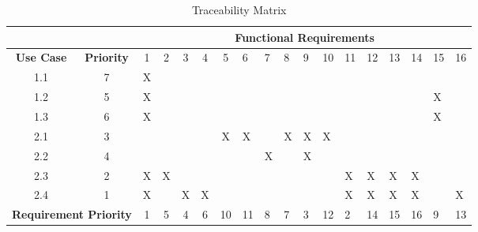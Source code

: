 \documentclass{article}
\begin{document}
		\begin{table}[h]
\centering
\caption{Traceability Matrix}
\label{my-label}
\begin{tabular}{cc|c|c|c|c|c|l|l|l|l|l|l|l|l|l|l|l|}
\cline{3-18}
                                        &                   & \multicolumn{16}{c|}{\textbf{Functional Requirements}}                 \\ \hline
\multicolumn{1}{|c|}{\textbf{Use Case}} & \textbf{Priority} & 1 & 2 & 3 & 4 & 5  & 6  & 7 & 8 & 9 & 10 & 11 & 12 & 13 & 14 & 15 & 16 \\ \hline
\multicolumn{1}{|c|}{1.1}               & 7                 & X &   &   &   &    &    &   &   &   &    &    &    &    &    &    &    \\ \hline
\multicolumn{1}{|c|}{1.2}               & 5                 & X &   &   &   &    &    &   &   &   &    &    &    &    &    & X  &    \\ \hline
\multicolumn{1}{|c|}{1.3}               & 6                 & X &   &   &   &    &    &   &   &   &    &    &    &    &    & X  &    \\ \hline
\multicolumn{1}{|c|}{2.1}               & 3                 &   &   &   &   & X  & X  &   & X & X & X  &    &    &    &    &    &    \\ \hline
\multicolumn{1}{|c|}{2.2}               & 4                 &   &   &   &   &    &    & X &   & X &    &    &    &    &    &    &    \\ \hline
\multicolumn{1}{|c|}{2.3}               & 2                 & X & X &   &   &    &    &   &   &   &    & X  & X  & X  & X  &    &    \\ \hline
\multicolumn{1}{|c|}{2.4}               & 1                 & X &   & X & X &    &    &   &   &   &    & X  & X  & X  & X  &    & X  \\ \hline
\multicolumn{2}{|c|}{\textbf{Requirement Priority}}         & 1 & 5 & 4 & 6 & 10 & 11 & 8 & 7 & 3 & 12 & 2  & 14 & 15 & 16 & 9  & 13 \\ \hline
\end{tabular}
\end{table}
		
		
		
\end{document}
